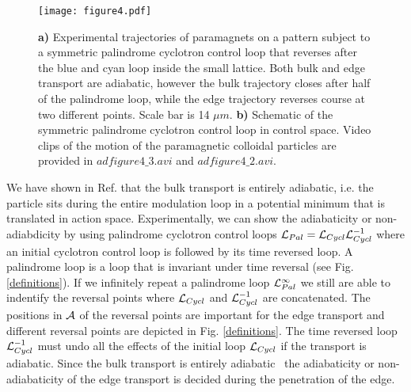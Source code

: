 \documentclass[12pt]{iopart}
\begin{document}
\begin{figure}
	\texttt{[image: figure4.pdf]}
	\caption{{\bf a)} Experimental trajectories of paramagnets on a pattern subject to a symmetric palindrome cyclotron control loop that reverses after the blue and cyan loop inside the small lattice. Both bulk and edge transport are adiabatic, however the bulk trajectory closes after half of the palindrome loop, while the edge trajectory reverses course at two different points. Scale bar is 14 $\mu m$. {\bf b)} Schematic of the symmetric palindrome cyclotron control loop in control space. Video clips of the motion of the paramagnetic colloidal particles are provided in $adfigure4\_3.avi$ and $adfigure4\_2.avi$. }
	\label{small}
\end{figure}

We have shown in Ref. \cite{tp2} that the bulk transport is entirely adiabatic, i.e. the particle sits during the entire
modulation loop in a potential minimum that is translated in action space. Experimentally, we can show the adiabaticity
or non-adiabdicity by using palindrome cyclotron control loops
${\cal L}_{Pal}={\cal L}_{Cycl}{\cal L}_{Cycl}^{-1}$ where an initial cyclotron control loop is followed by its time reversed loop. A palindrome loop is a loop that is invariant under time reversal (see Fig. \ref{definitions}).
If we infinitely repeat a palindrome loop ${\cal L}_{Pal}^\infty$ we still are able to indentify the reversal points where ${\cal L}_{Cycl}$ and ${\cal L}_{Cycl}^{-1}$ are concatenated. The positions in $\cal A$ of the reversal points are important for the edge transport and different reversal points are depicted in Fig. \ref{definitions}.  
The time reversed loop ${\cal L}_{Cycl}^{-1}$ must undo all the effects of the initial loop ${\cal L}_{Cycl}$ if the transport is adiabatic. Since the bulk transport is
entirely adiabatic~\cite{tp2} the adiabaticity or non-adiabaticity of the edge transport is  decided during the penetration of the edge. 
\end{document}
